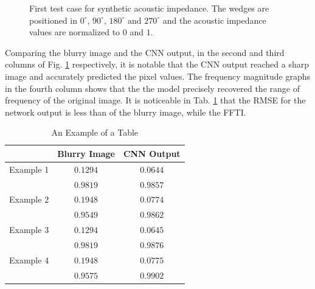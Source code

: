 \documentclass[conference,compsoc]{IEEEtran}
\begin{document}
\begin{figure}[!t]
{\label{fig_second_case_blurred}}
\hfil
{}
\caption{First test case for synthetic acoustic impedance. The wedges are positioned in 
$0^{\circ}$, $90^{\circ}$, $180^{\circ}$ and $270^{\circ}$ and the acoustic impedance values are normalized to $0$ and $1$.}
\label{fig_scenario1}
\end{figure}

Comparing the blurry image and the CNN output,
in the second and third columns of Fig. \ref{fig_scenario1} respectively,
it is notable that the CNN output reached a sharp image and accurately
predicted the pixel values. The frequency magnitude graphs in the fourth
column shows that the the model precisely recovered the range of frequency
of the original image. It is noticeable in Tab. \ref{table_caso_1}
that the RMSE for the network output is less than of the blurry image,
while the FFTI.
\begin{table}[!t]
\renewcommand{\arraystretch}{1.3}
\caption{An Example of a Table}
\label{table_caso_1}
\centering
\begin{tabular}{|c||c||c|}
\hline
 & Blurry Image & CNN Output \\
\hline
Example 1 & $0.1294$ & $0.0644$\\
\hline
	  & $0.9819$ & $0.9857$\\
\hline
Example 2 & $0.1948$ & $0.0774$ \\
\hline
	  & $0.9549$ & $0.9862$\\
\hline
Example 3 & $0.1294$ & $0.0645$\\
\hline
	  & $0.9819$ & $0.9876$\\
\hline
Example 4 & $0.1948$ & $0.0775$\\
\hline
	  & $0.9575$ & $0.9902$\\
\hline
\end{tabular}
\end{table}
\end{document}
